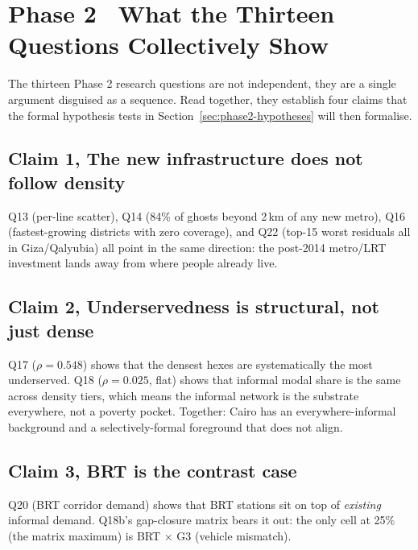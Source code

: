 
\section{Phase 2 \textbullet\ What the Thirteen Questions Collectively Show}
\label{sec:phase2-questions-conclusion}

The thirteen Phase 2 research questions are not independent, they are
a single argument disguised as a sequence. Read together, they
establish four claims that the formal hypothesis tests in
Section~\ref{sec:phase2-hypotheses} will then formalise.

\subsection*{Claim 1, The new infrastructure does not follow density}

Q13 (per-line scatter), Q14 (84\% of ghosts beyond 2\,km of any new
metro), Q16 (fastest-growing districts with zero coverage), and Q22
(top-15 worst residuals all in Giza/Qalyubia) all point in the same
direction: the post-2014 metro/LRT investment lands away from where
people already live.

\subsection*{Claim 2, Underservedness is structural, not just dense}

Q17 ($\rho = 0.548$) shows that the densest hexes are systematically
the most underserved. Q18 ($\rho = 0.025$, flat) shows that informal
modal share is the same across density tiers, which means the
informal network is the substrate everywhere, not a poverty pocket.
Together: Cairo has an everywhere-informal background and a
selectively-formal foreground that does not align.

\subsection*{Claim 3, BRT is the contrast case}

Q20 (BRT corridor demand) shows that BRT stations sit on top of
\emph{existing} informal demand. Q18b's gap-closure matrix bears it
out: the only cell at 25\% (the matrix maximum) is BRT $\times$ G3
(vehicle mismatch). 

